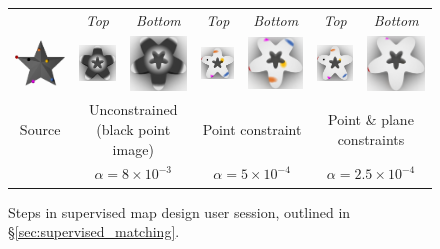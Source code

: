 \begin{figure}
\centering
\begin{tabular}{cc@{}cc@{}cc@{}c}
&
{\small \emph{Top}} & {\small\emph{Bottom}}&
{\small \emph{Top}} & {\small\emph{Bottom}}&
{\small \emph{Top}} & {\small\emph{Bottom}}\\
\includegraphics[height=.12\linewidth]{figures/interactive/source_surface.pdf}&
\includegraphics[height=.12\linewidth]{figures/interactive/initial_map_target_cropped.pdf}&
\includegraphics[height=.12\linewidth]{figures/interactive/initial_map_target_flip_cropped.pdf}&
\includegraphics[height=.12\linewidth]{figures/interactive/point_map_target_cropped.pdf}&
\includegraphics[height=.12\linewidth]{figures/interactive/point_map_target_flip_cropped.pdf}&
\includegraphics[height=.12\linewidth]{figures/interactive/reflection_map_target_cropped.pdf}&
\includegraphics[height=.12\linewidth]{figures/interactive/reflection_map_target_flip_cropped.pdf}\\
Source  & 
\multicolumn{2}{c}{Unconstrained (black point image)}&
\multicolumn{2}{c}{Point constraint}&
\multicolumn{2}{c}{Point \& plane constraints}\\
& \multicolumn{2}{c}{\small $\alpha\!=\!8\!\times\!10^{-3}$}
& \multicolumn{2}{c}{\small $\alpha\!=\!5\!\times\!10^{-4}$}
& \multicolumn{2}{c}{\small $\alpha\!=\!2.5\!\times\!10^{-4}$}
\end{tabular}\vspace{-.125in}
\caption{Steps in supervised map design user session, outlined in \S\ref{sec:supervised_matching}.\vspace{-.15in}}\label{fig:supervised_map}
\end{figure}
